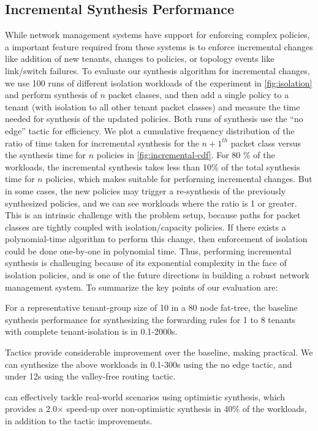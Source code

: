 \subsection{Incremental Synthesis
  Performance} \label{sec:incrementaleval} While network management
systems have support for enforcing complex policies, a important
feature required from these systems is to enforce incremental changes
like addition of new tenants, changes to policies, or topology events
like link/switch failures. To evaluate our synthesis algorithm for
incremental changes, we use 100 runs of different isolation workloads
of the experiment in \cref{fig:isolation} and perform synthesis of $n$
packet classes, and then add a single policy to a tenant (with
isolation to all other tenant packet classes) and measure the time
needed for synthesis of the updated policies. Both runs of synthesis
use the ``no edge'' tactic for efficiency. We plot a cumulative
frequency distribution of the ratio of time taken for incremental
synthesis for the $n+1^{th}$ packet class versus the synthesis time
for $n$ policies in \cref{fig:incremental-cdf}. For 80 \% of the
workloads, the incremental synthesis takes less than 10\% of the total
synthesis time for $n$ policies, which makes \Name suitable for
performing incremental changes. But in some cases, the new policies
may trigger a re-synthesis of the previously synthesized policies, and
we can see workloads where the ratio is 1 or greater. This is an
intrinsic challenge with the problem setup, because paths for packet
classes are tightly coupled with isolation/capacity policies. If there
exists a polynomial-time algorithm to perform this change, then
enforcement of isolation could be done one-by-one in polynomial time.
Thus, performing incremental synthesis is challenging because of its
exponential complexity in the face of isolation policies, and is one
of the future directions in building a robust network management
system. \newline To summarize the key points of our evaluation are:
\begin{compactitemize}
\item For a representative tenant-group size of 10 in a 80 node
  fat-tree, the baseline synthesis performance for synthesizing the
  forwarding rules for 1 to 8 tenants with complete tenant-isolation
  is in 0.1-2000s.
      \item Tactics provide considerable improvement over the
        baseline, making \Name practical.  We can synthesize the above
        workloads in 0.1-300s using the no edge tactic,
        and under 12s using the valley-free routing tactic.
      \item \Name can effectively tackle real-world scenarios using
        optimistic synthesis, which provides a 2.0$\times$ speed-up
        over non-optimistic synthesis in 40\% of the workloads, in
        addition to the tactic improvements.
\end{compactitemize}


